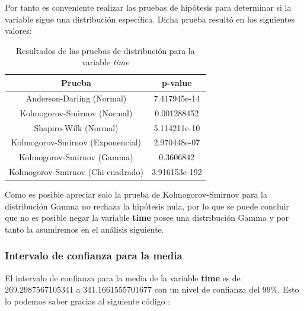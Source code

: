 \documentclass[a4paper,12pt]{article}
\begin{document}
Por tanto es conveniente realizar las pruebas de hipótesis para determinar si la variable sigue una distribución específica. Dicha prueba resultó en los siguientes valores:

\newpage

\begin{table}[h!]
    \centering
    \begin{tabular}{|c|c|}
        \hline
        \textbf{Prueba} & \textbf{p-value} \\
        \hline
        Anderson-Darling (Normal) & 7.417945e-14 \\
        \hline
        Kolmogorov-Smirnov (Normal) & 0.001288452 \\
        \hline
        Shapiro-Wilk (Normal) & 5.114211e-10 \\
        \hline
        Kolmogorov-Smirnov (Exponencial) & 2.970448e-07 \\
        \hline
        Kolmogorov-Smirnov (Gamma) & 0.3606842 \\
        \hline
        Kolmogorov-Smirnov (Chi-cuadrado) & 3.916153e-192 \\
        \hline
    \end{tabular}
    \caption{Resultados de las pruebas de distribución para la variable \textit{time}}
    \label{tab:pruebas_distribucion}
\end{table}

Como es posible apreciar solo la prueba de Kolmogorov-Smirnov para la distribución Gamma no rechaza la hipótesis nula, por lo que se puede concluir que no es posible negar la variable \textbf{time} posee una distribución Gamma y por tanto la asumiremos en el análisis siguiente.

\subsubsection*{Intervalo de confianza para la media}

El intervalo de confianza para la media de la variable \textbf{time} es de 269.2987567105341 a 341.1661555701677 con un nivel de confianza del 99\%. Esto lo podemos saber gracias al siguiente código :
\end{document}
